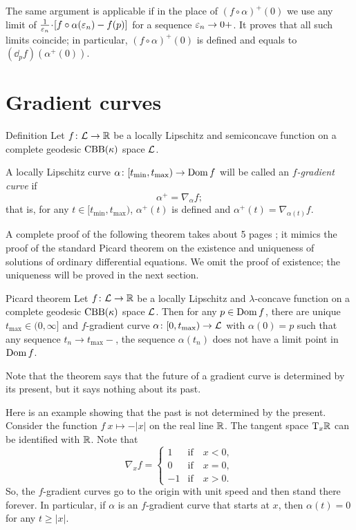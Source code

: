 The same argument is applicable if in the place of $(f\circ\alpha)^+(0)$
we use any limit of $\tfrac1{\eps_n}\cdot [f\circ\alpha(\eps_n)-f(p)]$ for a sequence $\varepsilon_n\to 0+$.
It proves that all such limits coincide; in particular, $(f\circ\alpha)^+(0)$ is defined and equals to $(\dd_pf)(\alpha^+(0))$.
\qeds


\section{Gradient curves}

\begin{thm}{Definition}\label{def:grad-curve}
Let $f\colon\mathcal{L}\to\mathbb{R}$ be a locally Lipschitz and semiconcave function on a complete geodesic $\mathrm{CBB}(\kappa)$ space
$\mathcal{L}$.

A locally Lipschitz curve $\alpha\colon[t_{\min},t_{\max})\to\mathop{\rm Dom}\nolimits f$ will be called an \emph{$f$-gradient curve} if
\[\alpha^+=\nabla_{\alpha} f;\]
that is, for any $t\in[t_{\min},t_{\max})$, $\alpha^+(t)$ is defined and 
$\alpha^+(t)=\nabla_{\alpha(t)} f$.
\end{thm}

A complete proof of the following theorem takes about 5 pages \cite{alexander-kapovitch-petrunin2024}; 
it mimics the proof of the standard Picard theorem on the existence and uniqueness of solutions of ordinary differential equations.
We omit the proof of existence;
the uniqueness will be proved in the next section.


\begin{thm}{Picard theorem}\label{thm:glob-exist-grad-curv}
Let $f\colon\mathcal{L}\to \mathbb{R}$ be a locally Lipschitz and $\lambda$-concave function on a complete geodesic $\mathrm{CBB}(\kappa)$ space $\mathcal{L}$.
Then for any $p\in \mathop{\rm Dom}\nolimits f$, there are unique $t_{\max}\in(0,\infty]$ and $f$-gradient curve $\alpha\colon[0,t_{\max})\to \mathcal{L}$ with $\alpha(0)=p$ such that any sequence $t_n\to t_{\max}-$, the sequence $\alpha(t_n)$ does not have a limit point in $\mathop{\rm Dom}\nolimits f$.
\end{thm}

Note that the theorem says that the future of a gradient curve is determined by its present, but it says nothing about its past.

Here is an example showing that the past is not determined by the present.
Consider the function $f\:x\mapsto -|x|$ on the real line $\mathbb{R}$.
The tangent space $\mathrm{T}_x\mathbb{R}$ can be identified with $\mathbb{R}$.
Note that 
\[\nabla_xf=
\begin{cases}
1&\text{if}\quad x<0,
\\
0&\text{if}\quad x=0,
\\
-1&\text{if}\quad x>0.
\end{cases}
\]
So, the $f$-gradient curves go to the origin with unit speed and then stand there forever.
In particular, if $\alpha$ is an $f$-gradient curve that starts at $x$,
then $\alpha(t)=0$ for any $t\ge |x|$.

